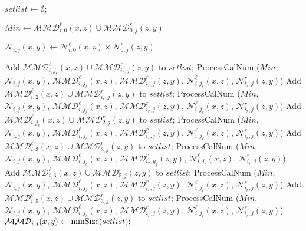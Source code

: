\documentclass[12pt]{article}
\theoremstyle{definition}
\theoremstyle{remark}
\begin{document}
\begin{algorithm}[h!]
	\begin{algorithmic}[1]
		\State $setlist\gets \emptyset;$
		
			\State $Min \gets \mathcal{MMD}_{i,0}^\ell(x,z)\cup \mathcal{MMD}_{0,j}^r(z,y)$
			
			\State $\mathcal{N}_{i,j}(x,y) \gets \mathcal{N}_{i,0}^\ell(x,z)\times \mathcal{N}_{0,j}^r(z,y)$
				
		\State Add $\mathcal{MMD}_{i,j_\ell}^\ell(x,z)\cup \mathcal{MMD}_{i_r,j}^r(z,y)$ to $setlist$;
		\State ProcessCalNum ($Min$, $\mathcal{N}_{i,j}(x,y)$, $\mathcal{MMD}_{i,j_\ell}^\ell(x,z)$, $ \mathcal{MMD}_{i_r,j}^r(z,y)$,  $\mathcal{N}_{i,j_\ell}^\ell(x,z)$, $ \mathcal{N}_{i_r,j}^r(z,y)$)
		\EndFor
		\State Add $\mathcal{MMD}_{i,2}^\ell(x,z)\cup \mathcal{MMD}_{i_r,j}^r(z,y)$ to $setlist$;
		\State ProcessCalNum ($Min$, $\mathcal{N}_{i,j}(x,y)$, $\mathcal{MMD}_{i,j_\ell}^\ell(x,z)$, $ \mathcal{MMD}_{i_r,j}^r(z,y)$,  $\mathcal{N}_{i,j_\ell}^\ell(x,z)$, $ \mathcal{N}_{i_r,j}^r(z,y)$)
		\EndFor
		\State Add $\mathcal{MMD}_{i,j_\ell}^\ell(x,z)\cup \mathcal{MMD}_{2,j}^r(z,y)$ to $setlist$;
	\State ProcessCalNum ($Min$, $\mathcal{N}_{i,j}(x,y)$, $\mathcal{MMD}_{i,j_\ell}^\ell(x,z)$, $ \mathcal{MMD}_{i_r,j}^r(z,y)$, 
		  $\mathcal{N}_{i,j_\ell}^\ell(x,z)$, $ \mathcal{N}_{i_r,j}^r(z,y)$)
		\EndFor
		\State Add $\mathcal{MMD}_{i,3}^\ell(x,z)\cup \mathcal{MMD}_{3,j}^r(z,y)$ to $setlist$;
		\State ProcessCalNum ($Min$, $\mathcal{N}_{i,j}(x,y)$, $\mathcal{MMD}_{i,j_\ell}^\ell(x,z)$, $ \mathcal{MMD}_{i_r,y_j}^r(z,y)$,  $\mathcal{N}_{i,j_\ell}^\ell(x,z)$, $ \mathcal{N}_{i_r,j}^r(z,y)$)
		\State Add $\mathcal{MMD}_{i,3}^\ell(x,z)\cup \mathcal{MMD}_{5,j}^r(z,y)$ to $setlist$;
		\State ProcessCalNum ($Min$, $\mathcal{N}_{i,j}(x,y)$, $\mathcal{MMD}_{i,j_\ell}^\ell(x,z)$, $ \mathcal{MMD}_{i_r,j}^r(z,y)$,  $\mathcal{N}_{i,j_\ell}^\ell(x,z)$, $ \mathcal{N}_{i_r,j}^r(z,y)$)
		\State Add $\mathcal{MMD}_{i,5}^\ell(x,z)\cup \mathcal{MMD}_{3,j}^r(z,y)$ to $setlist$;
	\State ProcessCalNum ($Min$, $\mathcal{N}_{i,j}(x,y)$, $\mathcal{MMD}_{i,j_\ell}^\ell(x,z)$, $ \mathcal{MMD}_{i_r,j}^r(z,y)$,  $\mathcal{N}_{i,j_\ell}^\ell(x,z)$, $ \mathcal{N}_{i_r,j}^r(z,y)$)
		\State $\mathcal{MMD}_{i,j}(x,y)\gets \mbox{minSize}(setlist);$
		\EndFor
		\EndProcedure
	\end{algorithmic}
\end{algorithm}
	
\end{document}
